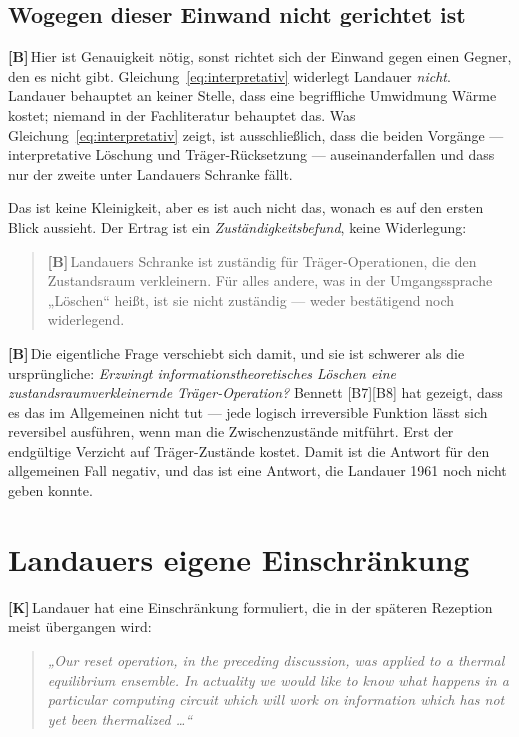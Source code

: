 \documentclass[11pt,a4paper]{article}
\newcommand{\LK}{\textcolor{layK}{\textbf{\footnotesize\textsf{[K]}}}\,}
\newcommand{\LB}{\textcolor{layB}{\textbf{\footnotesize\textsf{[B]}}}\,}
\theoremstyle{ffgft}
\begin{document}
\subsection{Wogegen dieser Einwand nicht gerichtet ist}

\LB Hier ist Genauigkeit nötig, sonst richtet sich der Einwand gegen einen Gegner,
den es nicht gibt. Gleichung~\eqref{eq:interpretativ} widerlegt Landauer
\emph{nicht}. Landauer behauptet an keiner Stelle, dass eine begriffliche
Umwidmung Wärme kostet; niemand in der Fachliteratur behauptet das. Was
Gleichung~\eqref{eq:interpretativ} zeigt, ist ausschließlich, dass die beiden
Vorgänge --- interpretative Löschung und Träger-Rücksetzung --- auseinanderfallen
und dass nur der zweite unter Landauers Schranke fällt.

Das ist keine Kleinigkeit, aber es ist auch nicht das, wonach es auf den ersten
Blick aussieht. Der Ertrag ist ein \emph{Zuständigkeitsbefund}, keine Widerlegung:

\begin{quote}
\LB Landauers Schranke ist zuständig für Träger-Operationen, die den
Zustandsraum verkleinern. Für alles andere, was in der Umgangssprache „Löschen“
heißt, ist sie nicht zuständig --- weder bestätigend noch widerlegend.
\end{quote}

\LB Die eigentliche Frage verschiebt sich damit, und sie ist schwerer als die
ursprüngliche: \emph{Erzwingt informationstheoretisches Löschen eine
zustandsraumverkleinernde Träger-Operation?} Bennett [B7][B8] hat gezeigt, dass es
das im Allgemeinen nicht tut --- jede logisch irreversible Funktion lässt sich
reversibel ausführen, wenn man die Zwischenzustände mitführt. Erst der endgültige
Verzicht auf Träger-Zustände kostet. Damit ist die Antwort für den allgemeinen
Fall negativ, und das ist eine Antwort, die Landauer 1961 noch nicht geben konnte.

\section{Landauers eigene Einschränkung}

\LK Landauer hat eine Einschränkung formuliert, die in der späteren Rezeption
meist übergangen wird:

\begin{quote}
\itshape
„Our reset operation, in the preceding discussion, was applied to a thermal
equilibrium ensemble. In actuality we would like to know what happens in a
particular computing circuit which will work on information which has not yet been
thermalized \ldots“ \upshape [B1]
\end{quote}
\end{document}
